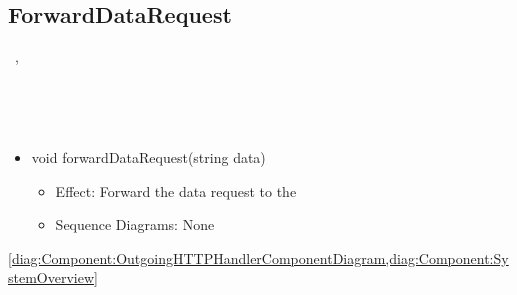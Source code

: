   \subsection{ForwardDataRequest}\label{int:InterfacesForwardDataRequest}
    \begin{description}
      \item[Provided by:] \iconcomponent{}~, \iconcomponent{}~
      \item[Required by:] \iconcomponent{}~ 
      \item[Operations:] ~
    \begin{itemize}[noitemsep,nolistsep,leftmargin=-.25cm]
      \item \textsf{void forwardDataRequest(string data)}
        \begin{itemize}[noitemsep,nolistsep]
           \item Effect: Forward the data request to the  
           \item Sequence Diagrams: None
        \end{itemize}
    \end{itemize}
      \item[Diagrams:] \cref{diag:Component:OutgoingHTTPHandlerComponentDiagram,diag:Component:SystemOverview}
    \end{description}

